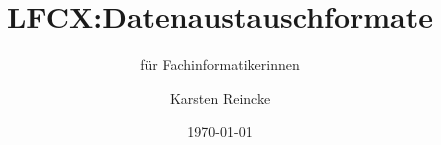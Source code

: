 \documentclass[]{beamer}
\title{LFCX:Datenaustauschformate}
\subtitle{für Fachinformatikerinnen}
\institute{GS-LDK}
\author{Karsten Reincke}
\date{\today}
\def\cfgGl{../../../cfg.gl/}
\begin{document}

\begin{frame}
  \titlepage
\end{frame}






\logo{}
\newpage



%
\end{document}
